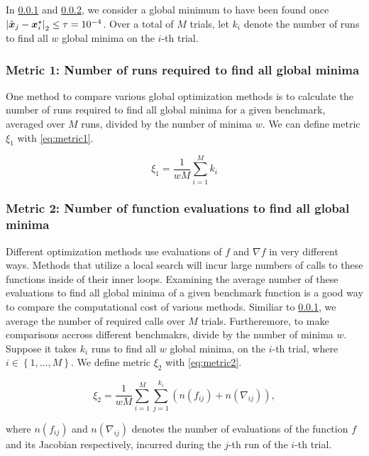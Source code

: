 In \cref{metric1} and \cref{metric2}, we consider a global minimum to have been found once 
$\left|\hat{\boldsymbol{x}}_j - \boldsymbol{x}^\star_i\right|_2 \leq \tau = 10^{-4}$. Over a total of $M$ trials, let
$k_i$ denote the number of runs to find all $w$ global minima on the $i$-th trial.

\subsubsection{Metric 1: Number of runs required to find all global minima}\label{metric1}

One method to compare various global optimization methods is to calculate the number of runs required to find all
global minima for a given benchmark, averaged over $M$ runs, divided by the number of minima $w$.
We can define metric $\xi_1$ with \cref{eq:metric1}.

\begin{equation}\label{eq:metric1}
\xi_1 = \frac{1}{wM} \sum_{i=1}^M k_i 
\end{equation}

\subsubsection{Metric 2: Number of function evaluations to find all global minima}\label{metric2}

Different optimization methods use evaluations of $f$ and $\nabla f$ in very different ways. Methods that utilize a
local search will incur large numbers of calls to these functions inside of their inner loops. Examining the average
number of these evaluations to find all global minima of a given benchmark function is a good way to compare the
computational cost of various methods. Similiar to \cref{metric1}, we average the number of required calls over
$M$ trials. Furtheremore, to make comparisons accross different benchmakrs, divide by the number of minima $w$.
Suppose it takes $k_i$ runs to find all $w$ global minima, on the $i$-th trial, 
where $i\in\left\lbrace 1,\ldots, M\right\rbrace$. We define metric $\xi_2$ with \cref{eq:metric2}.

\begin{equation}\label{eq:metric2}
\xi_2 = \frac{1}{wM}\sum_{i=1}^M \sum_{j=1}^{k_i} \left( n(f_{ij}) + n(\nabla_{ij}) \right),
\end{equation}

where $n(f_{ij})$ and $n(\nabla_{ij})$ denotes the number of evaluations of the function $f$ and its Jacobian respectively,
incurred during the $j$-th run of the $i$-th trial.

